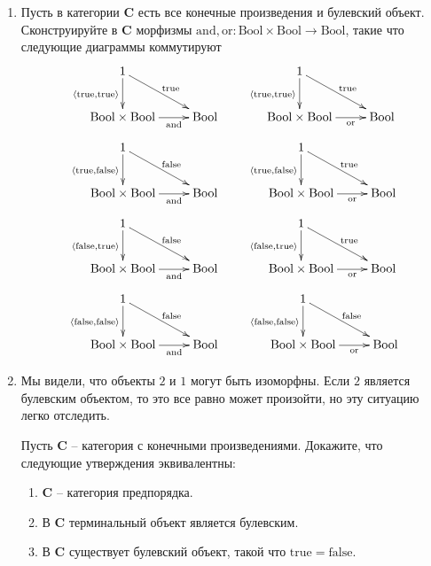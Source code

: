 \documentclass[draft]{article}
\newcommand{\cat}[1]{\mathbf{#1}}
\renewcommand{\C}{\cat{C}}
\newcommand{\bool}{\mathrm{Bool}}
\newcommand{\true}{\mathrm{true}}
\newcommand{\false}{\mathrm{false}}
\newcommand{\andb}{\mathrm{and}}
\newcommand{\orb}{\mathrm{or}}
\begin{document}
\begin{enumerate}
\item Пусть в категории $\C$ есть все конечные произведения и булевский объект.
Сконструируйте в $\C$ морфизмы $\andb, \orb : \bool \times \bool \to \bool$, такие что следующие диаграммы коммутируют
\[ \xymatrix{ 1 \ar[d]_{\langle \true, \true \rangle} \ar[rd]^{\true} \\
              \bool \times \bool \ar[r]_-{\andb} & \bool
            }
\qquad \xymatrix{ 1 \ar[d]_{\langle \true, \true \rangle} \ar[rd]^{\true} \\
              \bool \times \bool \ar[r]_-{\orb} & \bool
            } \]
\[ \xymatrix{ 1 \ar[d]_{\langle \true, \false \rangle} \ar[rd]^{\false} \\
              \bool \times \bool \ar[r]_-{\andb} & \bool
            }
\qquad \xymatrix{ 1 \ar[d]_{\langle \true, \false \rangle} \ar[rd]^{\true} \\
              \bool \times \bool \ar[r]_-{\orb} & \bool
            } \]
\[ \xymatrix{ 1 \ar[d]_{\langle \false, \true \rangle} \ar[rd]^{\false} \\
              \bool \times \bool \ar[r]_-{\andb} & \bool
            }
\qquad \xymatrix{ 1 \ar[d]_{\langle \false, \true \rangle} \ar[rd]^{\true} \\
              \bool \times \bool \ar[r]_-{\orb} & \bool
            } \]
\[ \xymatrix{ 1 \ar[d]_{\langle \false, \false \rangle} \ar[rd]^{\false} \\
              \bool \times \bool \ar[r]_-{\andb} & \bool
            }
\qquad \xymatrix{ 1 \ar[d]_{\langle \false, \false \rangle} \ar[rd]^{\false} \\
              \bool \times \bool \ar[r]_-{\orb} & \bool
            } \]

\item Мы видели, что объекты $2$ и $1$ могут быть изоморфны. Если $2$ является булевским объектом, то это все равно может произойти, но эту ситуацию легко отследить.

Пусть $\C$ -- категория с конечными произведениями.
Докажите, что следующие утверждения эквивалентны:
\begin{enumerate}
\item $\C$ -- категория предпорядка.
\item В $\C$ терминальный объект является булевским.
\item В $\C$ существует булевский объект, такой что $\true = \false$.
\end{enumerate}

\end{enumerate}
\end{document}
